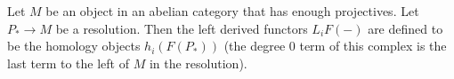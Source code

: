 \begin{definition} Let $M$ be an object in an abelian category that has enough projectives. Let $P_*\rightarrow M$ be a resolution. Then the left derived functors $L_iF(-)$ are defined to be the homology objects $h_i(F(P_*))$ (the degree $0$ term of this complex is the last term to the left of $M$ in the resolution).\end{definition}

